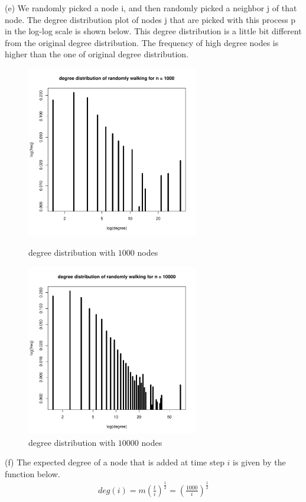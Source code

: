 \documentclass[draftcls,12pt,onecolumn]{IEEEtran}
\begin{document}
(e) We randomly picked a node i, and then randomly picked a neighbor j of that node. The degree distribution plot of nodes j that are picked with this process p in the log-log scale is shown below. This degree distribution is a little bit different from the original degree distribution. The frequency of high degree nodes is higher than the one of original degree distribution.
\begin{figure}[htbp]
\centering
\begin{minipage}[t]{0.48\textwidth}
\centering
\includegraphics[width=7.5cm]{1_2_e_degsmall.pdf}
\caption{degree distribution with $1000$ nodes}
\end{minipage}
\begin{minipage}[t]{0.48\textwidth}
\centering
\includegraphics[width=7.5cm]{1_2_e_deglarge.pdf}
\caption{degree distribution with $10000$ nodes}
\end{minipage}
\end{figure}

(f) The expected degree of a node that is added at time step $i$ is given by the function below.
\begin{align*}
deg(i)=m(\frac{t}{i})^{\frac{1}{2}}=(\frac{1000}{i})^{\frac{1}{2}}
\end{align*}
\end{document}
